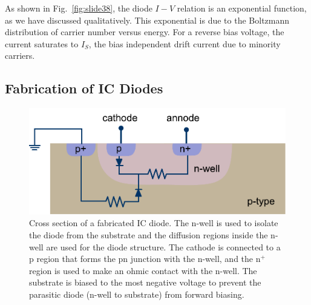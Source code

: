 As shown in Fig.~\ref{fig:slide38}, the diode $I-V$ relation is an exponential function, as we have discussed qualitatively.    This exponential is due to the Boltzmann distribution of carrier number versus energy.    For a reverse bias voltage,  the current saturates to $I_S$, the bias independent drift current due to minority carriers.
\subsection{Fabrication of IC Diodes}
\begin{figure}[tb]
\begin{center}
\includegraphics[width=.65\columnwidth]{slide44}
\end{center}
\caption{Cross section of a fabricated IC diode.  The n-well is used to isolate the diode from the substrate and the diffusion regions inside the n-well are used for the diode structure.  The cathode is connected to a p region that forms the pn junction with the n-well, and the n$^+$ region is used to make an ohmic contact with the n-well.  The substrate is biased to the most negative voltage to prevent the parasitic diode (n-well to substrate) from forward biasing.}
\label{fig:slide44}
\end{figure}

